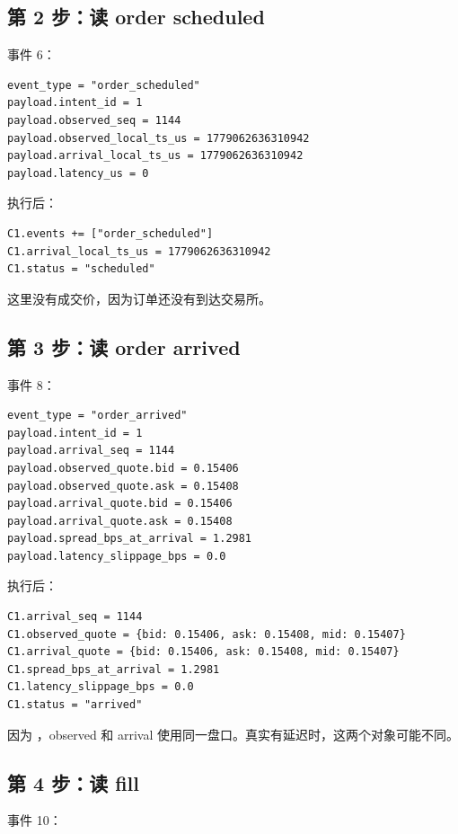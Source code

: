 \documentclass[11pt,a4paper]{ctexart}
\newcommand{\code}[1]{\texttt{\detokenize{#1}}}
\begin{document}
\subsection{第 2 步：读 order scheduled}

事件 6：

\begin{lstlisting}
event_type = "order_scheduled"
payload.intent_id = 1
payload.observed_seq = 1144
payload.observed_local_ts_us = 1779062636310942
payload.arrival_local_ts_us = 1779062636310942
payload.latency_us = 0
\end{lstlisting}

执行后：

\begin{lstlisting}
C1.events += ["order_scheduled"]
C1.arrival_local_ts_us = 1779062636310942
C1.status = "scheduled"
\end{lstlisting}

这里没有成交价，因为订单还没有到达交易所。

\subsection{第 3 步：读 order arrived}

事件 8：

\begin{lstlisting}
event_type = "order_arrived"
payload.intent_id = 1
payload.arrival_seq = 1144
payload.observed_quote.bid = 0.15406
payload.observed_quote.ask = 0.15408
payload.arrival_quote.bid = 0.15406
payload.arrival_quote.ask = 0.15408
payload.spread_bps_at_arrival = 1.2981
payload.latency_slippage_bps = 0.0
\end{lstlisting}

执行后：

\begin{lstlisting}
C1.arrival_seq = 1144
C1.observed_quote = {bid: 0.15406, ask: 0.15408, mid: 0.15407}
C1.arrival_quote = {bid: 0.15406, ask: 0.15408, mid: 0.15407}
C1.spread_bps_at_arrival = 1.2981
C1.latency_slippage_bps = 0.0
C1.status = "arrived"
\end{lstlisting}

因为 \code{arrival_quote_lag=0}，observed 和 arrival 使用同一盘口。真实有延迟时，这两个对象可能不同。

\subsection{第 4 步：读 fill}

事件 10：
\end{document}
